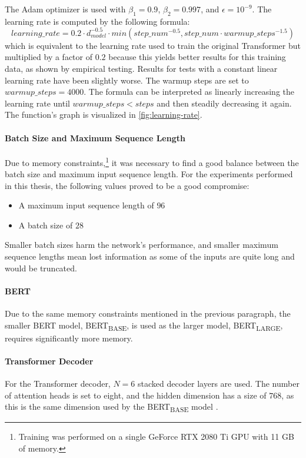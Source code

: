 The Adam optimizer \cite{article} is used with $\beta_1=0.9$, $\beta_2=0.997$, and $\epsilon = 10^{-9}$.
The learning rate is computed by the following formula:
\[
	learning\_rate = 0.2 \cdot d_{model}^{-0.5} \cdot min(step\_num^{-0.5}, step\_num \cdot warmup\_steps^{-1.5})
\]
which is equivalent to the learning rate used to train the original Transformer \cite[p.~7]{1706.03762} but multiplied by a factor of $0.2$ because this yields better results for this training data, as shown by empirical testing.
Results for tests with a constant linear learning rate have been slightly worse.
The warmup steps are set to $warmup\_steps = 4000$.
The formula can be interpreted as linearly increasing the learning rate until $warmup\_steps < steps$ and then steadily decreasing it again.
The function's graph is visualized in \cref{fig:learning-rate}.

\paragraph{Batch Size and Maximum Sequence Length}

Due to memory constraints,\footnote{Training was performed on a single GeForce RTX 2080 Ti GPU with 11 GB of memory.} it was necessary to find a good balance between the batch size and maximum input sequence length.
For the experiments performed in this thesis, the following values proved to be a good compromise:
\begin{itemize}
\item A maximum input sequence length of $96$ %
\item A batch size of $28$
\end{itemize}

Smaller batch sizes harm the network's performance, and smaller maximum sequence lengths mean lost information as some of the inputs are quite long and would be truncated.

\paragraph{BERT}

Due to the same memory constraints mentioned in the previous paragraph, the smaller BERT model, BERT\textsubscript{BASE}, is used as the larger model, BERT\textsubscript{LARGE}, requires significantly more memory.

\paragraph{Transformer Decoder}

For the Transformer decoder, $N=6$ stacked decoder layers are used.
The number of attention heads is set to eight, and the hidden dimension has a size of $768$, as this is the same dimension used by the BERT\textsubscript{BASE} model \cite[p.~3]{devlin2018bert}.

